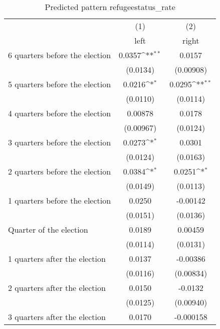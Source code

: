 \begin{table}[htbp]\centering
\def\sym#1{\ifmmode^{#1}\else\(^{#1}\)\fi}
\caption{Predicted pattern refugeestatus\_rate}
\begin{tabular}{l*{2}{c}}
\hline\hline
                    &\multicolumn{1}{c}{(1)}&\multicolumn{1}{c}{(2)}\\
                    &\multicolumn{1}{c}{left}&\multicolumn{1}{c}{right}\\
\hline
 6 quarters before the election&      0.0357\sym{**} &      0.0157         \\
                    &    (0.0134)         &   (0.00908)         \\
[1em]
 5 quarters before the election&      0.0216\sym{*}  &      0.0295\sym{**} \\
                    &    (0.0110)         &    (0.0114)         \\
[1em]
 4 quarters before the election&     0.00878         &      0.0178         \\
                    &   (0.00967)         &    (0.0124)         \\
[1em]
 3 quarters before the election&      0.0273\sym{*}  &      0.0301         \\
                    &    (0.0124)         &    (0.0163)         \\
[1em]
 2 quarters before the election&      0.0384\sym{*}  &      0.0251\sym{*}  \\
                    &    (0.0149)         &    (0.0113)         \\
[1em]
 1 quarters before the election&      0.0250         &    -0.00142         \\
                    &    (0.0151)         &    (0.0136)         \\
[1em]
Quarter of the election&      0.0189         &     0.00459         \\
                    &    (0.0114)         &    (0.0131)         \\
[1em]
 1 quarters after the election&      0.0137         &    -0.00386         \\
                    &    (0.0116)         &   (0.00834)         \\
[1em]
 2 quarters after the election&      0.0150         &     -0.0132         \\
                    &    (0.0125)         &   (0.00940)         \\
[1em]
 3 quarters after the election&      0.0170         &   -0.000158         \\

\end{tabular}
\end{table}
